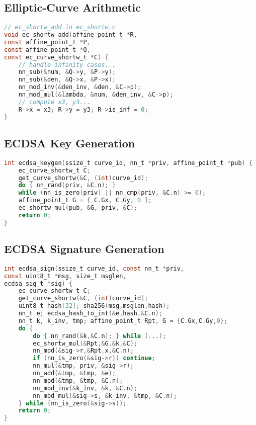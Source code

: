 \documentclass[12pt,a4paper]{article}
\begin{document}
\subsection{Elliptic-Curve Arithmetic}
\begin{lstlisting}[language=C]
// ec_shortw_add in ec_shortw.c
void ec_shortw_add(affine_point_t *R,
const affine_point_t *P,
const affine_point_t *Q,
const ec_curve_shortw_t *C) {
	// handle infinity cases...
	nn_sub(&num, &Q->y, &P->y);
	nn_sub(&den, &Q->x, &P->x);
	nn_mod_inv(&den_inv, &den, &C->p);
	nn_mod_mul(&lambda, &num, &den_inv, &C->p);
	// compute x3, y3...
	R->x = x3; R->y = y3; R->is_inf = 0;
}
\end{lstlisting}

\subsection{ECDSA Key Generation}
\begin{lstlisting}[language=C]
int ecdsa_keygen(ssize_t curve_id, nn_t *priv, affine_point_t *pub) {
	ec_curve_shortw_t C;
	get_curve_shortw(&C, (int)curve_id);
	do { nn_rand(priv, &C.n); }
	while (nn_is_zero(priv) || nn_cmp(priv, &C.n) >= 0);
	affine_point_t G = { C.Gx, C.Gy, 0 };
	ec_shortw_mul(pub, &G, priv, &C);
	return 0;
}
\end{lstlisting}

\subsection{ECDSA Signature Generation}
\begin{lstlisting}[language=C]
int ecdsa_sign(ssize_t curve_id, const nn_t *priv,
const uint8_t *msg, size_t msglen,
ecdsa_sig_t *sig) {
	ec_curve_shortw_t C;
	get_curve_shortw(&C, (int)curve_id);
	uint8_t hash[32]; sha256(msg,msglen,hash);
	nn_t e; ecdsa_hash_to_int(&e,hash,&C.n);
	nn_t k, k_inv, tmp; affine_point_t Rpt, G = {C.Gx,C.Gy,0};
	do {
		do { nn_rand(&k,&C.n); } while (...);
		ec_shortw_mul(&Rpt,&G,&k,&C);
		nn_mod(&sig->r,&Rpt.x,&C.n);
		if (nn_is_zero(&sig->r)) continue;
		nn_mul(&tmp, priv, &sig->r);
		nn_add(&tmp, &tmp, &e);
		nn_mod(&tmp, &tmp, &C.n);
		nn_mod_inv(&k_inv, &k, &C.n);
		nn_mod_mul(&sig->s, &k_inv, &tmp, &C.n);
	} while (nn_is_zero(&sig->s));
	return 0;
}
\end{lstlisting}
\end{document}
